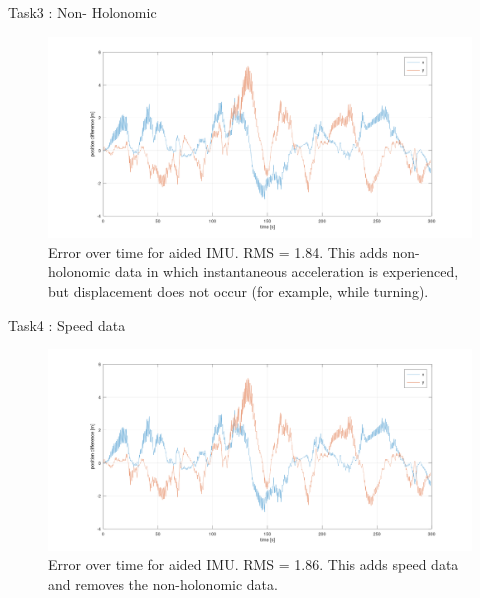 \documentclass[10pt]{beamer}
\theoremstyle{definition}
\begin{document}
\begin{frame}{Task3 : Non- Holonomic}
\begin{figure}

    \includegraphics[width=\textwidth]{images/holo.png}
    \caption{Error over time for aided IMU. RMS = 1.84. This adds non-holonomic data in which instantaneous acceleration is experienced, but displacement does not occur (for example, while turning).}
    
\end{figure}
\end{frame}
\begin{frame}{Task4 : Speed data}
    \begin{figure}

    \includegraphics[width=\textwidth]{images/speed.png}
    \caption{Error over time for aided IMU. RMS = 1.86. This adds speed data and removes the non-holonomic data.}
    
\end{figure}
\end{frame}



% 
% 
\end{document}
